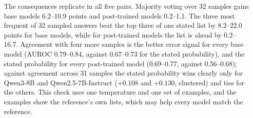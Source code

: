 \documentclass[11pt]{article}
\begin{document}
The consequences replicate in all five pairs. Majority voting over 32 samples gains base models 6.2--10.9 points and post-trained models 0.2--1.1. The three most frequent of 32 sampled answers beat the top three of one stated list by 8.2--22.0 points for base models, while for post-trained models the list is ahead by 0.2--16.7. Agreement with four more samples is the better error signal for every base model (AUROC 0.79--0.84, against 0.67--0.73 for the stated probability), and the stated probability for every post-trained model (0.69--0.77, against 0.56--0.68); against agreement across 31 samples the stated probability wins clearly only for Qwen3-8B and Qwen2.5-7B-Instruct ($+0.108$ and $+0.130$, clustered) and ties for the others.
This check uses one temperature and one set of examples, and the examples show the reference's own lists, which may help every model match the reference.
\end{document}
